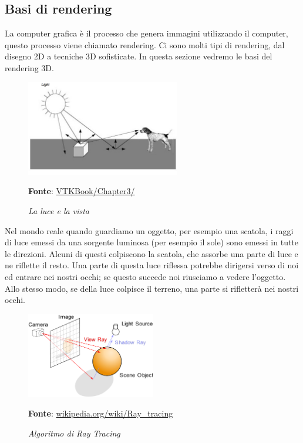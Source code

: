 \subsection{Basi di rendering}\label{sec:basi-rendering}
La computer grafica è il processo che genera immagini utilizzando il computer, questo processo viene chiamato rendering. Ci sono molti tipi di rendering, dal disegno 2D a tecniche 3D sofisticate. In questa sezione vedremo le basi del rendering 3D.

\begin{figure}[h]
    \centering
    \includegraphics[width=0.6\textwidth]{immagini/volumerendering/lightpropagation.png}
    \caption{\textit{La luce e la vista}}
    \textbf{Fonte}: \href{https://lorensen.github.io/VTKExamples/site/VTKBook/03Chapter3/}{VTKBook/Chapter3/}
    \label{fig: Propagazione della luce}
\end{figure}

Nel mondo reale quando guardiamo un oggetto, per esempio una scatola, i raggi di luce emessi da una sorgente luminosa (per esempio il sole) sono emessi in tutte le direzioni. Alcuni di questi colpiscono la scatola, che assorbe una parte di luce e ne riflette il resto. Una parte di questa luce riflessa potrebbe dirigersi verso di noi ed entrare nei nostri occhi; se questo succede noi riusciamo a vedere l'oggetto. Allo stesso modo, se della luce colpisce il terreno, una parte si rifletterà nei nostri occhi.

\begin{figure}[h]
    \centering
    \includegraphics[width=0.5\textwidth]{immagini/volumerendering/ray_tracing_diagram.png}
    \caption{\textit{Algoritmo di Ray Tracing}}
    \textbf{Fonte}: \href{https://en.wikipedia.org/wiki/Ray_tracing_(graphics)}{wikipedia.org/wiki/Ray\_tracing}
    \label{fig: Algoritmo di Ray Tracing}
\end{figure}

